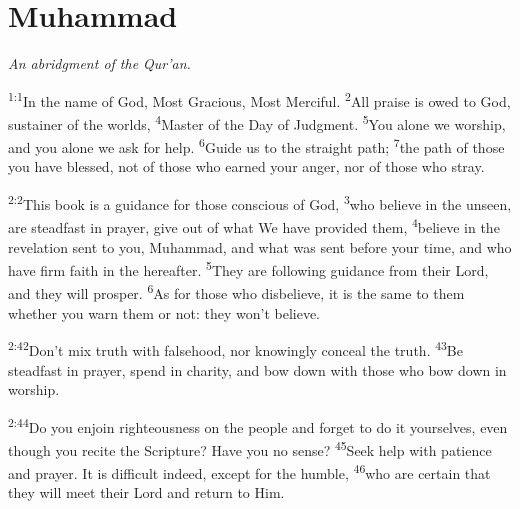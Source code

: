 \documentclass[openany,12pt,english]{book}
\newenvironment{para}{\par\pretolerance=100\tolerance=200\setlength{\emergencystretch}{0.6em}\relax}{\par}
\begin{document}
\chapter*{Muhammad}
\begin{changemargin}{.6in}{.6in}
  \begin{center}
    \itshape
    An a\-bridg\-ment of the Qur'an.
  \end{center}
\end{changemargin}
\begin{para}
    \textsuperscript{1:1}\thinspace{}In the name of God, Most Gra\-cious, Most Mer\-ci\-ful.
    \textsuperscript{2}\thinspace{}All praise is owed to God, sus\-tain\-er of the worlds,
    \textsuperscript{4}\thinspace{}Mas\-ter of the Day of Judg\-ment.
    \textsuperscript{5}\thinspace{}You a\-lone we wor\-ship, and you a\-lone we ask for help.
    \textsuperscript{6}\thinspace{}Guide us to the straight path;
    \textsuperscript{7}\thinspace{}the path of those you have bless\-ed, not of those who earned your an\-ger, nor of those who stray.
\end{para}

\bigskip{}

\begin{para}
    \textsuperscript{2:2}\thinspace{}This book is a guid\-ance for those con\-scious of God,
    \textsuperscript{3}\thinspace{}who be\-lieve in the un\-seen, are stead\-fast in pray\-er, give out of what We have pro\-vid\-ed them,
    \textsuperscript{4}\thinspace{}be\-lieve in the rev\-e\-la\-tion sent to you, Muhammad, and what was sent be\-fore your time, and who have firm faith in the here\-af\-ter.
    \textsuperscript{5}\thinspace{}They are fol\-low\-ing guid\-ance from their Lord, and they will pros\-per.
    \textsuperscript{6}\thinspace{}As for those who dis\-be\-lieve, it is the same to them wheth\-er you warn them or not: they won't be\-lieve.
\end{para}

\begin{para}
    \textsuperscript{2:42}\thinspace{}Don't mix truth with false\-hood, nor know\-ing\-ly con\-ceal the truth.
    \textsuperscript{43}\thinspace{}Be stead\-fast in pray\-er, spend in char\-i\-ty, and bow down with those who bow down in wor\-ship.
\end{para}

\begin{para}
    \textsuperscript{2:44}\thinspace{}Do you en\-join right\-eous\-ness on the peo\-ple and for\-get to do it your\-selves, e\-ven though you re\-cite the Scrip\-ture? Have you no sense?
    \textsuperscript{45}\thinspace{}Seek help with pa\-tience and pray\-er. It is dif\-fi\-cult in\-deed, ex\-cept for the hum\-ble,
    \textsuperscript{46}\thinspace{}who are cer\-tain that they will meet their Lord and re\-turn to Him.
\end{para}
\end{document}
